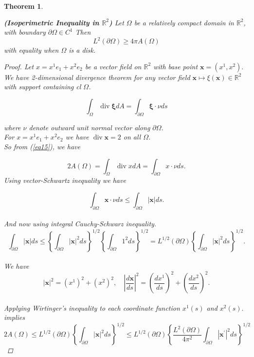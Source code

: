 \documentclass[oneside]{book}
\newtheorem{theorem}{Theorem}[section]
\begin{document}
	\begin{theorem}
		\label{t:2}
		
		\textbf{(Isoperimetric Inequality in $\mathbb{R}^{2}$)} Let $\Omega$ be a relatively compact domain in $\mathbb{R}^{2}$, with boundary $\partial \Omega \in C^{1}$ Then
		\begin{equation}
		\label{eq14}  
		L^{2}(\partial \Omega) \geq 4 \pi A(\Omega) 
		\end{equation}
		with equality when $\Omega$ is a disk.
		
		\begin{proof}
			
			Let $x=x^{1} e_{1}+x^{2} e_{2}$ be a vector field on $\mathbb{R}^{2}$ with base point $\textbf{x}=\left(x^{1}, x^{2}\right) .$
			We have 2-dimensional divergence theorem for any vector
			field $\textbf{x} \mapsto \xi(\textbf{x}) \in \mathbb{R}^{2}$ with support containing cl $\Omega$.
			
			\begin{equation}
			\label{eq15}  
			\int_{\Omega} \operatorname{div} \boldsymbol{\xi} d A=\int_{\partial \Omega} \boldsymbol{\xi} \cdot \nu d s 
			\end{equation} 
			
			where $\nu$ denote outward unit normal vector along $\partial\Omega$. \\
			
			For  $ x=x^{1} e_{1}+x^{2} e_{2}$ we have 
			$\operatorname{div} \textbf{x}=2$ on all $\Omega$. 
			\\ 
			
			So from (\ref{eq15}), we have
			
			$$ 2 A(\Omega)=\int_{\Omega} \operatorname{div} x d A=\int_{\partial \Omega} x \cdot \nu d s.$$ 
			Using vector-Schwartz inequality we have 
			
			$$ \int_{\partial \Omega} \mathbf{x} \cdot \nu d s \leq \int_{\partial \Omega} | \mathbf{x}| d s.  $$ 
			\\
			And now using integral Cauchy-Schwarz inequality. \\
			$$\int_{\partial \Omega}|\mathbf{x}| d s \leq\left\{\int_{\partial \Omega}|\mathbf{x}|^{2} d s\right\}^{1 / 2}\left\{\int_{\partial \Omega} 1^{2} d s\right\}^{1 / 2} =L^{1 / 2}(\partial \Omega)\left\{\int_{\partial \Omega}|\mathbf{x}|^{2} d s\right\}^{1 / 2}.$$ \\ 
			We have  
			$$|\mathbf{x}|^{2} = \left(x^{1}\right)^{2}+\left(x^{2}\right)^{2}, \quad\left|\frac{d \mathbf{x}}{d s}\right|^{2}=\left(\frac{d x^{1}}{d s}\right)^{2}+\left(\frac{d x^{2}}{d s}\right)^{2}.$$\\
			Applying Wirtinger's inequality to each coordinate function $x^{1}(s)$ and $x^{2}(s).$ 
			\\ implies 
			$$ 2 A(\Omega) \leq L^{1 / 2}(\partial \Omega)\left\{\int_{\partial \Omega}|\mathbf{x}|^{2} d s\right\}^{1 / 2} \leq L^{1 / 2}(\partial \Omega)\left\{\frac{L^{2}(\partial \Omega)}{4 \pi^{2}} \int_{\partial \Omega}\left|\mathbf{x}^{\prime}\right|^{2} d s\right\}^{1 / 2}$$
			

\end{proof}
\end{theorem}
\end{document}
